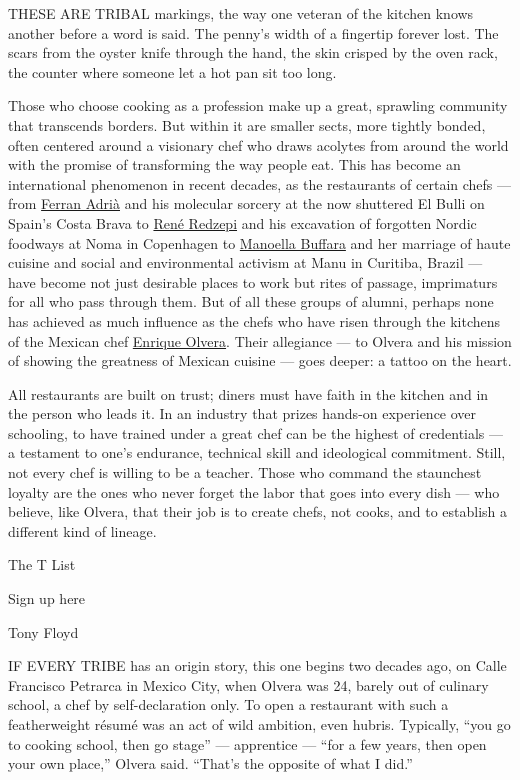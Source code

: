 THESE ARE TRIBAL markings, the way one veteran of the kitchen knows
another before a word is said. The penny's width of a fingertip forever
lost. The scars from the oyster knife through the hand, the skin crisped
by the oven rack, the counter where someone let a hot pan sit too long.

Those who choose cooking as a profession make up a great, sprawling
community that transcends borders. But within it are smaller sects, more
tightly bonded, often centered around a visionary chef who draws
acolytes from around the world with the promise of transforming the way
people eat. This has become an international phenomenon in recent
decades, as the restaurants of certain chefs --- from
\href{https://www.nytimes.com/topic/person/ferran-adria}{Ferran Adrià}
and his molecular sorcery at the now shuttered El Bulli on Spain's Costa
Brava to
\href{https://www.nytimes.com/interactive/2014/09/10/style/tmagazine/redzepi-searches-for-the-perfect-taco.html}{René
Redzepi} and his excavation of forgotten Nordic foodways at Noma in
Copenhagen to
\href{https://www.nytimes.com/2019/09/03/dining/ella-restaurant-manoella-buffara.html}{Manoella
Buffara} and her marriage of haute cuisine and social and environmental
activism at Manu in Curitiba, Brazil --- have become not just desirable
places to work but rites of passage, imprimaturs for all who pass
through them. But of all these groups of alumni, perhaps none has
achieved as much influence as the chefs who have risen through the
kitchens of the Mexican chef
\href{https://www.instagram.com/enriqueolveraf/?hl=en}{Enrique Olvera}.
Their allegiance --- to Olvera and his mission of showing the greatness
of Mexican cuisine --- goes deeper: a tattoo on the heart.

All restaurants are built on trust; diners must have faith in the
kitchen and in the person who leads it. In an industry that prizes
hands-on experience over schooling, to have trained under a great chef
can be the highest of credentials --- a testament to one's endurance,
technical skill and ideological commitment. Still, not every chef is
willing to be a teacher. Those who command the staunchest loyalty are
the ones who never forget the labor that goes into every dish --- who
believe, like Olvera, that their job is to create chefs, not cooks, and
to establish a different kind of lineage.

The T List \textbar{}

Sign up here

Tony Floyd

IF EVERY TRIBE has an origin story, this one begins two decades ago, on
Calle Francisco Petrarca in Mexico City, when Olvera was 24, barely out
of culinary school, a chef by self-declaration only. To open a
restaurant with such a featherweight résumé was an act of wild ambition,
even hubris. Typically, ``you go to cooking school, then go stage'' ---
apprentice --- ``for a few years, then open your own place,'' Olvera
said. ``That's the opposite of what I did.''

